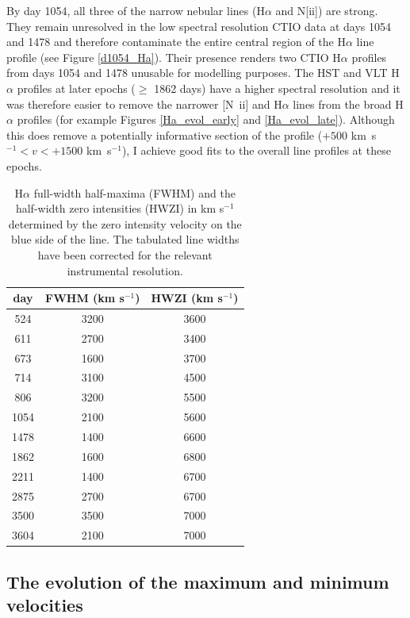 By day 1054, all three of the narrow nebular lines (H$\alpha$ and N[{\sc ii}]) are strong.  They 
remain unresolved in the low spectral resolution CTIO data at days 1054 
and 1478 and therefore contaminate the entire central region of the 
H$\alpha$ line profile (see Figure \ref{d1054_Ha}).  Their presence renders two CTIO H$\alpha$ 
profiles from days 1054 and 1478 unusable for modelling purposes.  The HST 
and VLT H$\alpha$ profiles at later epochs ($\ge$ 1862 days) have a higher 
spectral resolution and it was therefore easier to remove the narrower 
[N~{\sc ii}] and H$\alpha$ lines from the broad H$\alpha$ profiles (for 
example Figures \ref{Ha_evol_early} and \ref{Ha_evol_late}). Although this 
does remove a potentially informative section of the profile ($+500$ 
km~s$^{-1}<v<+1500$ km~s$^{-1}$), I achieve good fits to the overall line 
profiles at these epochs.

\begin{table}
\centering
\caption{H$\alpha$ full-width half-maxima (FWHM) and the half-width zero 
intensities (HWZI) in km s$^{-1}$ determined by the zero intensity velocity on the 
blue side of the line.  The tabulated line widths have been corrected for the relevant instrumental resolution.}
\begin{tabular}{c cc}
day & FWHM (km s$^{-1}$) & HWZI (km s$^{-1}$) \\
\hline
524 & 3200 & 3600 \\
611 & 2700 & 3400 \\
673 & 1600 & 3700 \\
714 & 3100 & 4500 \\
806 & 3200 & 5500 \\
1054 & 2100 & 5600 \\
1478 & 1400 & 6600 \\
1862 & 1600 & 6800 \\
2211 & 1400 & 6700 \\
2875 & 2700 & 6700 \\
3500 & 3500 & 7000 \\
3604 & 2100 & 7000

\end{tabular}

\label{FWHM}
\end{table}%

\subsection{The evolution of the maximum and minimum velocities}


